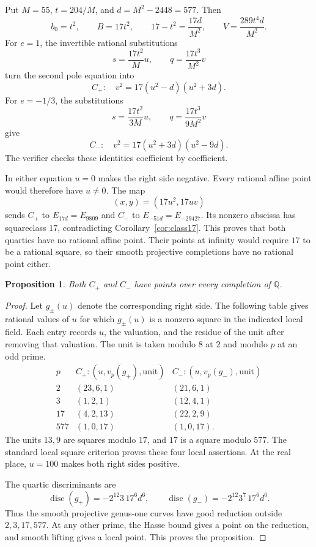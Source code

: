 \documentclass[11pt,a4paper]{article}
\newtheorem{proposition}[theorem]{Proposition}
\theoremstyle{definition}\newtheorem{definition}[theorem]{Definition}
\newcommand{\Q}{\mathbb Q}\newcommand{\Z}{\mathbb Z}
\begin{document}
Put $M=55$, $t=204/M$, and $d=M^2-2448=577$.  Then
\[
 b_0=t^2,\qquad B=17t^2,\qquad
 17-t^2=\frac{17d}{M^2},\qquad V=\frac{289t^4d}{M^2}.
\]
For $e=1$, the invertible rational substitutions
\[
             s=\frac{17t^2}{M}u,\qquad
             q=\frac{17t^3}{M^2}v
\]
turn the second pole equation into
\begin{equation}\label{eq:Cplus}
                  C_+:\quad v^2=17(u^2-d)(u^2+3d).
\end{equation}
For $e=-1/3$, the substitutions
\[
             s=\frac{17t^2}{3M}u,\qquad
             q=\frac{17t^3}{9M^2}v
\]
give
\begin{equation}\label{eq:Cminus}
                  C_-:\quad v^2=17(u^2+3d)(u^2-9d).
\end{equation}
The verifier checks these identities coefficient by coefficient.

In either equation $u=0$ makes the right side negative.  Every
rational affine point would therefore have $u\ne0$.  The map
\[
                         (x,y)=(17u^2,17uv)
\]
sends $C_+$ to $E_{17d}=E_{9809}$ and $C_-$ to
$E_{-51d}=E_{-29427}$.  Its nonzero abscissa has squareclass $17$,
contradicting Corollary~\ref{cor:class17}.  This proves that both
quartics have no rational affine point.  Their points at infinity
would require $17$ to be a rational square, so their smooth
projective completions have no rational point either.

\begin{proposition}\label{prop:local}
Both $C_+$ and $C_-$ have points over every completion of $\Q$.
\end{proposition}
\begin{proof}
Let $g_\pm(u)$ denote the corresponding right side.  The following
table gives rational values of $u$ for which $g_\pm(u)$ is a
nonzero square in the indicated local field.  Each entry records
$u$, the valuation, and the residue of the unit after removing
that valuation.  The unit is taken modulo $8$ at $2$ and modulo
$p$ at an odd prime.
\[
\begin{array}{c|c|c}
 p&C_+:(u,v_p(g_+),\text{unit})&C_-:(u,v_p(g_-),\text{unit})\\\hline
 2&(23,6,1)&(21,6,1)\\
 3&(1,2,1)&(12,4,1)\\
 17&(4,2,13)&(22,2,9)\\
 577&(1,0,17)&(1,0,17).
\end{array}
\]
The units $13,9$ are squares modulo $17$, and $17$ is a square
modulo $577$.  The standard local square criterion proves these
four local assertions.  At the real place, $u=100$ makes both
right sides positive.

The quartic discriminants are
\[
 \operatorname{disc}(g_+)=-2^{12}3\,17^6d^6,
 \qquad
 \operatorname{disc}(g_-)=-2^{12}3^7\,17^6d^6.
\]
Thus the smooth projective genus-one curves have good reduction
outside $2,3,17,577$.  At any other prime, the Hasse bound gives
a point on the reduction, and smooth lifting gives a local point.
This proves the proposition.
\end{proof}
\end{document}
